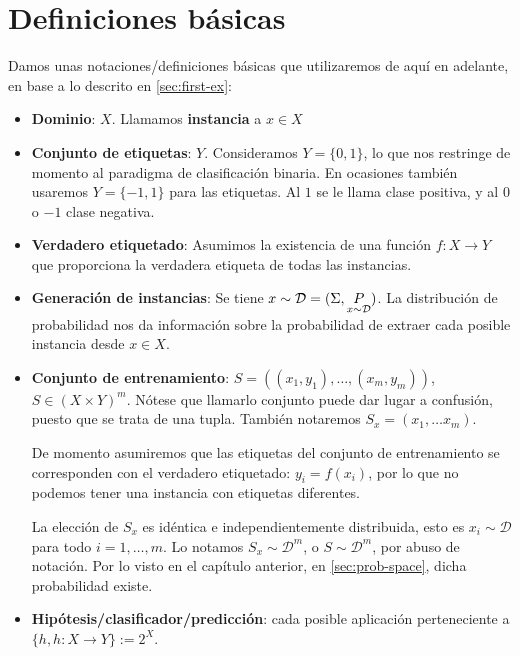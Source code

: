 \section{Definiciones básicas}
\label{sec:defs}

Damos unas notaciones/definiciones básicas que utilizaremos de aquí en adelante, en base a lo descrito en \ref{sec:first-ex}:

\begin{itemize}
\item \textbf{Dominio}: $X$. Llamamos \textbf{instancia} a $x\in X$

\item \textbf{Conjunto de etiquetas}: $Y$. Consideramos $Y = \{0,1\}$, lo que nos restringe de momento al paradigma de clasificación binaria. 
En ocasiones también usaremos $Y = \{-1,1\}$ para las etiquetas. Al $1$ se le llama clase positiva, y al $0$ o $-1$ clase negativa.

\item \textbf{Verdadero etiquetado}: \sloppy Asumimos la existencia de una función ${f: X \rightarrow Y}$ 
que proporciona la verdadera etiqueta de todas las instancias.

\item \textbf{Generación de instancias}: \fussy Se tiene $x\sim \mathcal{D} = (\Sigma, \underset{x\sim \mathcal{D}}{P})$. La distribución de probabilidad nos da 
información sobre la probabilidad de extraer cada posible instancia desde  $x \in X$. 

\item \textbf{Conjunto de entrenamiento}: $S = ((x_1,y_1), \ldots, (x_m,y_m))$, $S\in (X \times Y)^m$.
Nótese que llamarlo conjunto puede dar lugar a confusión, puesto que se trata de una tupla. También notaremos 
$S_x = (x_1, \ldots x_m)$.

De momento asumiremos que las etiquetas del conjunto de entrenamiento se corresponden con el verdadero etiquetado: 
$y_i = f(x_i)$, por lo que no podemos tener una instancia con etiquetas diferentes.

La elección de $S_x$ es idéntica e independientemente distribuida, esto es $x_i \sim \mathcal{D}$ para todo $i=1, \ldots, m$.
Lo notamos $S_x \sim \mathcal{D}^m$, o $S \sim \mathcal{D}^m$, por abuso de notación. Por lo visto en el capítulo
anterior, en \ref{sec:prob-space}, dicha probabilidad existe.

\item \textbf{Hipótesis/clasificador/predicción}: cada posible aplicación perteneciente a 
$\{h, h:X \rightarrow Y\} := 2^{X}$. 


\end{itemize}
